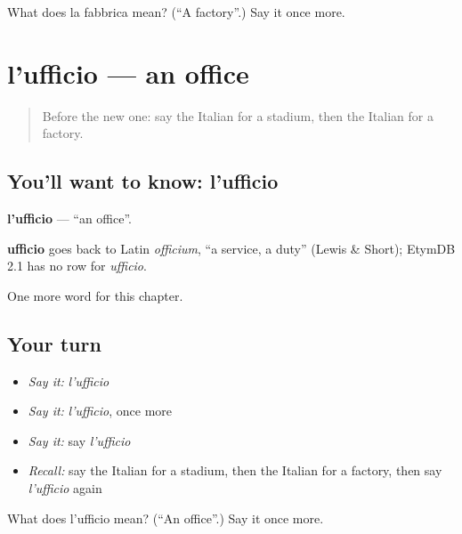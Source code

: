 \begin{tcolorbox}[breakable,colback=teal!4,colframe=teal!35!black,title={Before you move on}]
What does la fabbrica mean? (\textquotedblleft{}A factory\textquotedblright{}.) Say it once more.
\end{tcolorbox}
\section[l'ufficio]{l'ufficio — an office}

\label{lesson:IT-C89-ufficio}



\begin{quote}
Before the new one: say the Italian for a stadium, then the Italian for a factory.
\end{quote}

\subsection*{You'll want to know: l'ufficio}
\textbf{l'ufficio} — \textquotedblleft{}an office\textquotedblright{}.

\begin{cousinweb}
\textbf{ufficio} goes back to Latin \emph{officium}, \textquotedblleft{}a service, a duty\textquotedblright{} (Lewis \& Short); EtymDB 2.1 has no row for \emph{ufficio}.
\end{cousinweb}

\begin{grammarlens}[title={What you've built}]
One more word for this chapter.
\end{grammarlens}

\subsection*{Your turn}
\begin{itemize}
\raggedright
  \item \emph{Say it:} \emph{l'ufficio}
  \item \emph{Say it:} \emph{l'ufficio}, once more
  \item \emph{Say it:} say \emph{l'ufficio}
  \item \emph{Recall:} say the Italian for a stadium, then the Italian for a factory, then say \emph{l'ufficio} again
\end{itemize}

\begin{tcolorbox}[breakable,colback=teal!4,colframe=teal!35!black,title={Before you move on}]
What does l'ufficio mean? (\textquotedblleft{}An office\textquotedblright{}.) Say it once more.
\end{tcolorbox}
